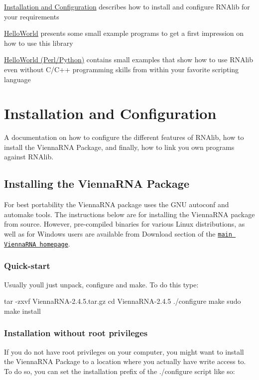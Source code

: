 
\begin{DoxyItemize}
\item \hyperlink{install}{Installation and Configuration} describes how to install and configure {\ttfamily R\+N\+Alib} for your requirements
\item \hyperlink{helloworld}{Hello\+World} presents some small example programs to get a first impression on how to use this library
\item \hyperlink{helloworld_swig}{Hello\+World (Perl/\+Python)} contains small examples that show how to use R\+N\+Alib even without C/\+C++ programming skills from within your favorite scripting language 
\end{DoxyItemize}\hypertarget{install}{}\section{Installation and Configuration}\label{install}
A documentation on how to configure the different features of {\ttfamily R\+N\+Alib}, how to install the Vienna\+R\+NA Package, and finally, how to link you own programs against {\ttfamily R\+N\+Alib}.\hypertarget{install_installation}{}\subsection{Installing the Vienna\+R\+N\+A Package}\label{install_installation}
For best portability the Vienna\+R\+NA package uses the G\+NU autoconf and automake tools. The instructions below are for installing the Vienna\+R\+NA package from source. However, pre-\/compiled binaries for various Linux distributions, as well as for Windows users are available from Download section of the \href{https://www.tbi.univie.ac.at/RNA}{\tt main Vienna\+R\+NA homepage}.\hypertarget{install_quickstart}{}\subsubsection{Quick-\/start}\label{install_quickstart}
Usually you\textquotesingle{}ll just unpack, configure and make. To do this type\+:

\begin{DoxyVerb}tar -zxvf ViennaRNA-2.4.5.tar.gz
cd ViennaRNA-2.4.5
./configure
make
sudo make install
\end{DoxyVerb}
\hypertarget{install_userdir_install}{}\subsubsection{Installation without root privileges}\label{install_userdir_install}
If you do not have root privileges on your computer, you might want to install the Vienna\+R\+NA Package to a location where you actually have write access to. To do so, you can set the installation prefix of the ./configure script like so\+:

